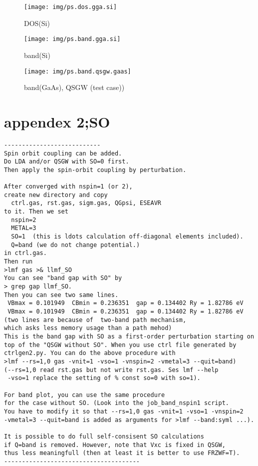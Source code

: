 \documentclass[a4paper,10pt,epsf,fleqn]{article}
\begin{document}
\begin{figure}[hbtp]
 \begin{center}
  \texttt{[image: img/ps.dos.gga.si]}
  \vspace{5mm}
  \caption{DOS(Si)}
 \end{center}
\end{figure}


\begin{figure}[hbtp]
 \begin{center}
  \texttt{[image: img/ps.band.gga.si]}
  \caption{band(Si)}
 \end{center}
\end{figure}

\begin{figure}[hbtp]
 \begin{center}
  \texttt{[image: img/ps.band.qsgw.gaas]}
  \caption{band(GaAs), QSGW (test case))}
 \end{center}
\end{figure}

\section{appendex 2;SO}
\begin{verbatim}
---------------------------
Spin orbit coupling can be added.
Do LDA and/or QSGW with SO=0 first.
Then apply the spin-orbit coupling by perturbation.

After converged with nspin=1 (or 2), 
create new directory and copy
  ctrl.gas, rst.gas, sigm.gas, QGpsi, ESEAVR
to it. Then we set
  nspin=2 
  METAL=3
  SO=1  (this is ldots calculation off-diagonal elements included).
  Q=band (we do not change potential.)
in ctrl.gas. 
Then run
>lmf gas >& llmf_SO
You can see "band gap with SO" by 
> grep gap llmf_SO.
Then you can see two same lines.
 VBmax = 0.101949  CBmin = 0.236351  gap = 0.134402 Ry = 1.82786 eV
 VBmax = 0.101949  CBmin = 0.236351  gap = 0.134402 Ry = 1.82786 eV
(two lines are because of  two-band path mechanism, 
which asks less memory usage than a path mehod)
This is the band gap with SO as a first-order perturbation starting on
top of the "QSGW without SO". When you use ctrl file generated by
ctrlgen2.py. You can do the above procedure with
>lmf --rs=1,0 gas -vnit=1 -vso=1 -vnspin=2 -vmetal=3 --quit=band)
(--rs=1,0 read rst.gas but not write rst.gas. Ses lmf --help
 -vso=1 replace the setting of % const so=0 with so=1).

For band plot, you can use the same procedure 
for the case without SO. (Look into the job_band_nspin1 script.
You have to modify it so that --rs=1,0 gas -vnit=1 -vso=1 -vnspin=2
-vmetal=3 --quit=band is added as arguments for >lmf --band:syml ...).

It is possible to do full self-consisent SO calculations
if Q=band is removed. However, note that Vxc is fixed in QSGW, 
thus less meaningfull (then at least it is better to use FRZWF=T).
--------------------------------------
\end{verbatim}
\end{document}
